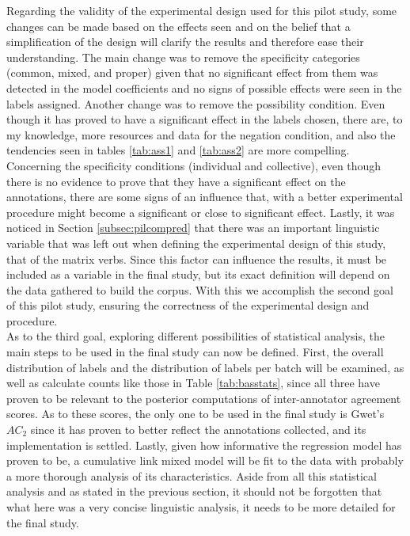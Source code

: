 Regarding the validity of the experimental design used for this pilot study, some changes can be made based on the effects seen and on the belief that a simplification of the design will clarify the results and therefore ease their understanding. The main change was to remove the specificity categories (common, mixed, and proper) given that no significant effect from them was detected in the model coefficients and no signs of possible effects were seen in the labels assigned. Another change was to remove the possibility condition. Even though it has proved to have a significant effect in the labels chosen, there are, to my knowledge, more resources and data for the negation condition, and also the tendencies seen in tables \ref{tab:ass1} and \ref{tab:ass2} are more compelling. Concerning the specificity conditions (individual and collective), even though there is no evidence to prove that they have a significant effect on the annotations, there are some signs of an influence that, with a better experimental procedure might become a significant or close to significant effect. Lastly, it was noticed in Section \ref{subsec:pilcompred} that there was an important linguistic variable that was left out when defining the experimental design of this study, that of the matrix verbs. Since this factor can influence the results, it must be included as a variable in the final study, but its exact definition will depend on the data gathered to build the corpus. With this we accomplish the second goal of this pilot study, ensuring the correctness of the experimental design and procedure.\\

As to the third goal, exploring different possibilities of statistical analysis, the main steps to be used in the final study can now be defined. First, the overall distribution of labels and the distribution of labels per batch will be examined, as well as calculate counts like those in Table \ref{tab:basstats}, since all three have proven to be relevant to the posterior computations of inter-annotator agreement scores. As to these scores, the only one to be used in the final study is Gwet's $AC_2$ since it has proven to better reflect the annotations collected, and its implementation is settled. Lastly, given how informative the regression model has proven to be, a cumulative link mixed model will be fit to the data with probably a more thorough analysis of its characteristics. Aside from all this statistical analysis and as stated in the previous section, it should not be forgotten that what here was a very concise linguistic analysis, it needs to be more detailed for the final study.\\  

